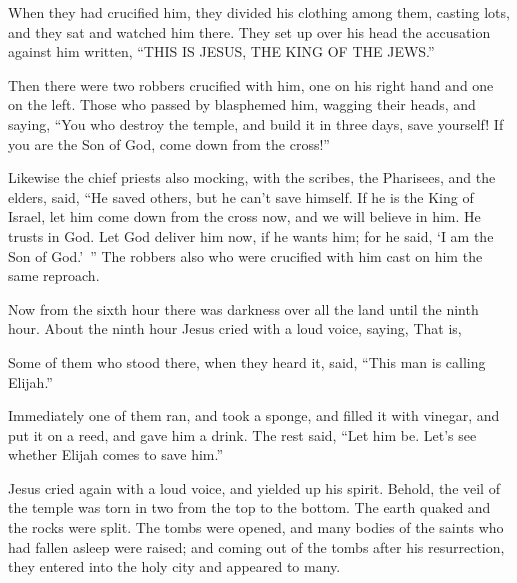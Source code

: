 {When they had crucified him, they divided his clothing among them, casting lots,
and they sat and watched him there.
They set up over his head the accusation against him written, “THIS IS JESUS, THE KING OF THE JEWS.”
\par }{\PP {}Then there were two robbers crucified with him, one on his right hand and one on the left.
Those who passed by blasphemed him, wagging their heads,
and saying, “You who destroy the temple, and build it in three days, save yourself! If you are the Son of God, come down from the cross!”
\par }{\PP {}Likewise the chief priests also mocking, with the scribes, the Pharisees, and the elders, said,
“He saved others, but he can’t save himself. If he is the King of Israel, let him come down from the cross now, and we will believe in him.
He trusts in God. Let God deliver him now, if he wants him; for he said, ‘I am the Son of God.’ ”
The robbers also who were crucified with him cast on him the same reproach.
\par }{\PP {}Now from the sixth hour there was darkness over all the land until the ninth hour.
About the ninth hour Jesus cried with a loud voice, saying,
{}
{} That is,
{}
\par }{\PP {}Some of them who stood there, when they heard it, said, “This man is calling Elijah.”
\par }{\PP {}Immediately one of them ran, and took a sponge, and filled it with vinegar, and put it on a reed, and gave him a drink.
The rest said, “Let him be. Let’s see whether Elijah comes to save him.”
\par }{\PP {}Jesus cried again with a loud voice, and yielded up his spirit.
Behold, the veil of the temple was torn in two from the top to the bottom. The earth quaked and the rocks were split.
The tombs were opened, and many bodies of the saints who had fallen asleep were raised;
and coming out of the tombs after his resurrection, they entered into the holy city and appeared to many.
}
